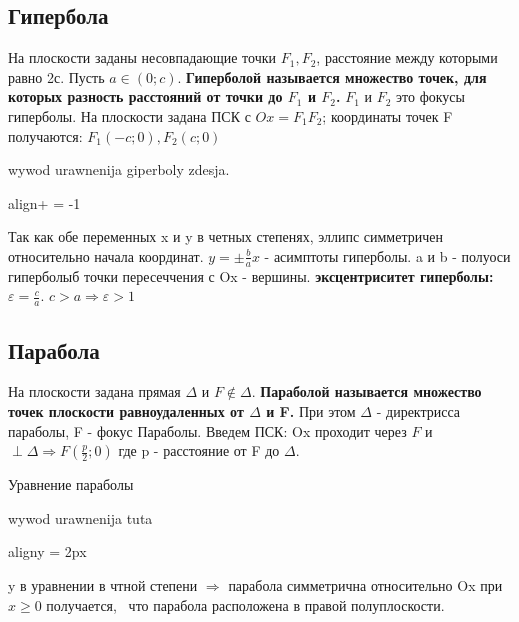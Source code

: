 \documentclass[oneside]{book}
\newcommand{\boxedeq}[2]{\begin{empheq}[box={\fboxsep=6pt\fbox}]{align}\label{#1}#2\end{empheq}}
\begin{document}
\subsection{Гипербола}
На плоскости заданы несовпадающие точки $F_1, F_2$, расстояние между которыми равно 2с. Пусть $a \in (0; c)$.
\textbf{Гиперболой называется множество точек, для которых разность расстояний от точки до $F_1$ и $F_2$.} $F_1$ и $F_2$ это
фокусы гиперболы. На плоскости задана ПСК с $Ox = F_1F_2$; координаты точек F получаются: $F_1(-c; 0), F_2(c; 0)$
\begin{center}
    \tikzset{>=stealth}

    wywod urawnenija giperboly zdesja.

    \boxedeq{eq:*}{+ = -1}

\end{center}
Так как обе переменных x и y в четных степенях, эллипс симметричен относительно начала координат.
$y = \pm\frac{b}{a}x$ - асимптоты гиперболы. a и b - полуоси гиперболыб точки пересеччения с Ox - вершины.
\textbf{эксцентриситет гиперболы: $\varepsilon = \frac{c}{a}$}. $c > a \Rightarrow \varepsilon >1$

\subsection{Парабола}
На плоскости задана прямая $\Delta$ и $F \notin \Delta$. \textbf{Параболой называется множество точек плоскости
равноудаленных от $\Delta$ и F.} При этом $\Delta$ - директрисса параболы, F - фокус Параболы. Введем ПСК:
Ox проходит через $F$ и $\perp \Delta \Rightarrow F(\frac{p}{2}; 0)$ где p - расстояние от F до $\Delta$.
\begin{center}
    Уравнение параболы

    wywod urawnenija tuta

    \boxedeq{eq:*}{y = \pm 2px}
\end{center}
y в уравнении в чтной степени $\Rightarrow$ парабола симметрична относительно Ox при $x \geq 0$ получается, \
что парабола расположена в правой полуплоскости.
\setcounter{chapter}{3}
\end{document}
